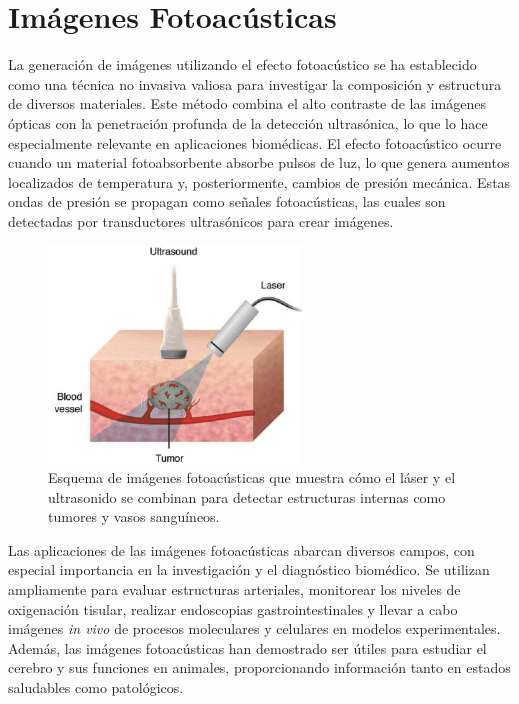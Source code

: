 \section{Imágenes Fotoacústicas} \label{sec:intro}

La generación de imágenes utilizando el efecto fotoacústico se ha establecido como una técnica no invasiva valiosa para investigar la composición y estructura de diversos materiales. Este método combina el alto contraste de las imágenes ópticas con la penetración profunda de la detección ultrasónica, lo que lo hace especialmente relevante en aplicaciones biomédicas. El efecto fotoacústico ocurre cuando un material fotoabsorbente absorbe pulsos de luz, lo que genera aumentos localizados de temperatura y, posteriormente, cambios de presión mecánica. Estas ondas de presión se propagan como señales fotoacústicas, las cuales son detectadas por transductores ultrasónicos para crear imágenes.

\begin{figure}[H]
    \centering
    \includegraphics[width=0.6\textwidth]{Images/effect.png} %
    \caption{Esquema de imágenes fotoacústicas que muestra cómo el láser y el ultrasonido se combinan para detectar estructuras internas como tumores y vasos sanguíneos.}
    \label{fig:photoacoustic_scheme}
\end{figure}

Las aplicaciones de las imágenes fotoacústicas abarcan diversos campos, con especial importancia en la investigación y el diagnóstico biomédico. Se utilizan ampliamente para evaluar estructuras arteriales, monitorear los niveles de oxigenación tisular, realizar endoscopias gastrointestinales y llevar a cabo imágenes \textit{in vivo} de procesos moleculares y celulares en modelos experimentales. Además, las imágenes fotoacústicas han demostrado ser útiles para estudiar el cerebro y sus funciones en animales, proporcionando información tanto en estados saludables como patológicos.

